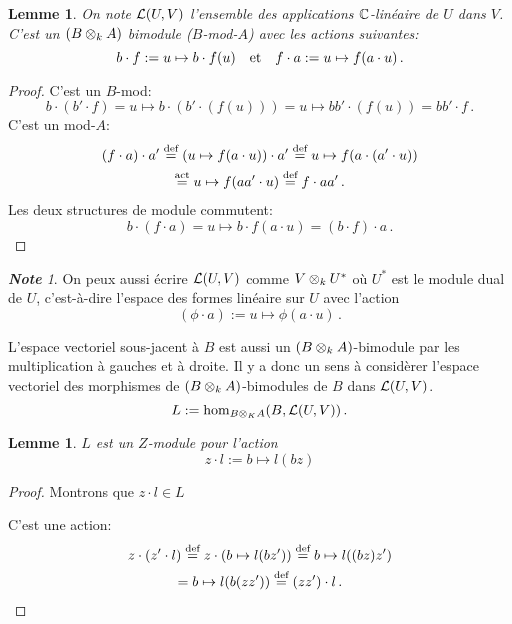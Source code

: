 \documentclass[francais,a4paper,11pt,reqno]{amsart}
\theoremstyle{plain}
\newtheorem{LEMME}[THEO]{\bf Lemme}
\theoremstyle{definition}
\theoremstyle{remark}
\newtheorem{NOTE}[THEO]{\bf Note}
\newcommand{\act}{\cdot}
\newcommand\eqcom[1]{\mathrel{\overset{\text{#1}}{=}}}
\begin{document}
\begin{LEMME}
  On note $\operatorname{\mathcal L}(U, V)$ l'ensemble des applications ${\mathbb C}$-linéaire de $U$ dans
  $V$. C'est un $(B\otimes_k A)$ bimodule ($B$-mod-$A$) avec les actions
  suivantes:
  \begin{equation}
    b\act f := u\mapsto b\act f(u)
    \qandq
    f\act a := u\mapsto f(a\act u)\,.
  \end{equation}
\end{LEMME}
\begin{proof}
  C'est un $B$-mod:
  \begin{equation}
    b\act (b'\act f) = u\mapsto b \act (b'\act(f(u)))
    = u\mapsto b b'\act(f(u)) = bb'\act f\,.
  \end{equation}
  C'est un mod-$A$:
  \begin{multline}
    (f\act a) \act a'
    \eqcom{def}(u\mapsto f(a\act u)) \act a'
    \eqcom{def}u\mapsto f(a\act (a' \act u))\\
    \eqcom{act}u\mapsto f(aa'\act u)
    \eqcom{def}f\act aa'\,.\qedhere
  \end{multline}
  Les deux structures de module commutent:
  \begin{equation}
    b\act (f\act a) = u\mapsto b\act f(a\act u) = (b\act f)\act a\,.
  \end{equation}
\end{proof}
\begin{NOTE}
  On peux aussi écrire $\operatorname{\mathcal L}(U, V)$ comme $V\otimes_k U^*$ où $U^*$ est le
  module dual de $U$, c'est-à-dire l'espace des formes linéaire sur $U$ avec
  l'action
  \begin{equation}
  (\phi\act a) := u\mapsto \phi(a\act u)\,.
\end{equation}
\end{NOTE}
\bigskip

L'espace vectoriel sous-jacent à $B$ est aussi un $(B\otimes_k A)$-bimodule
par les multiplication à gauches et à droite. Il y a donc un sens à considèrer
l'espace vectoriel des morphismes de $(B\otimes_k A)$-bimodules de $B$ dans
$\operatorname{\mathcal L}(U,V)$.
\begin{equation}
  L := \hom_{B\otimes_K A}(B, \operatorname{\mathcal L}(U, V))\,.
\end{equation}
\begin{LEMME}
  $L$ est un $Z$-module pour l'action
  \begin{equation}
    z\act l := b\mapsto l(bz)
  \end{equation}
\end{LEMME}
\begin{proof}
  Montrons que $z\act l\in L$\TODO{}

  C'est une action:
  \begin{multline}
    z\act(z'\act l)
    \eqcom{def}z\act(b \mapsto l(b z'))
    \eqcom{def}b \mapsto l((b z) z') \\
    =b \mapsto l(b (zz')) \eqcom{def}(zz') \act l\,.\qedhere
  \end{multline}
\end{proof}
\end{document}
